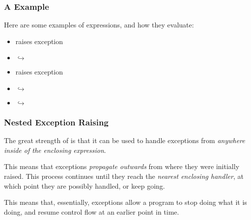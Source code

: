 \documentclass[aspectratio=169, handout]{beamer}
\begin{document}
\begin{frame}[fragile]
  \frametitle{A  Example}

  Here are some examples of  expressions, and how they evaluate:

  \pause
  \vspace{\fill}

  \begin{itemize}
    \item {} raises exception 
    \item {} $\hookrightarrow$ 
    \item {} raises exception 
    \item {} $\hookrightarrow$ 
    \item {} $\hookrightarrow$ 
  \end{itemize}

\end{frame}

\begin{frame}[fragile]
  \frametitle{Nested Exception Raising}

  \rprs

  The great strength of  is that it can be used to handle
  exceptions from \textit{anywhere inside of the enclosing expression}.

  \pause
  \vspace{\fill}


  \pause
  \vspace{\fill}

  This means that exceptions \textit{propagate outwards} from where
  they were initially raised. This process continues until they reach
  the \textit{nearest enclosing handler}, at which point they are
  possibly handled, or keep going.

  \pause
  \vspace{\fill}

  This means that, essentially, exceptions allow a program to stop
  doing what it is doing, and resume control flow at an earlier point
  in time.
\end{frame}
\end{document}
